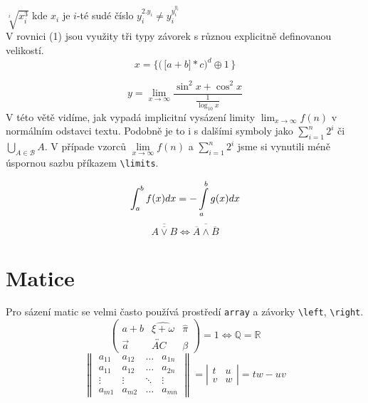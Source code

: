 \documentclass[a4paper, 11pt, twocolumn]{article}
\theoremstyle{definition}
\theoremstyle{definition}
\begin{document}
\quad $\sqrt[i]{x_i^3}$ kde $x_i$ je $i$-té sudé číslo \quad $y_i^{2.y_i}\neq y_i^{y_i^{y_i}}$\\


V rovnici (1) jsou využity tři typy závorek s různou explicitně definovanou velikostí.
\begin{equation}
x =\bigg\{\Big( \,\big[a + b\big] * c\Big)^d \oplus 1 \,\bigg\} \label{rovnice_1}
\end{equation}

$$
y = \lim_{x\to\infty} \frac{\sin^2 x + \cos^2x}{\frac{1}{\log_{10}{x}}}
$$
V této větě vidíme, jak vypadá implicitní vysázení limity $\lim_{x\to\infty} f(n)$ v normálním odstavci textu. Podobně je to i s dalšími symboly jako $\sum_{i=1}^{n} 2^{i}$ či $\bigcup_{A\in \mathcal{B}} A$. V případe vzorců $\lim\limits_{x\to\infty} f(n)$ a $\sum\limits_{i=1}^{n} 2^{i}$ jsme si vynutili méně úspornou sazbu příkazem \verb|\limits|.

\begin{equation}
\int_{a}^{b} f(x)dx = -\int\displaylimits_{a}^{b} g(x)dx
\label{rovnice_2}
\end{equation}
\begin{equation}
\overline{\overline{ A\lor B}} \Leftrightarrow \overline{\overline{A} \land \overline{B}}
\label{rovnice_3}
\end{equation}

\section{Matice}
Pro sázení matic se velmi často používá prostředí \verb|array| a závorky \verb|\left|, \verb|\right|.
$$
\left(
\begin{array}{ccc}
a + b & \widehat{\xi + \omega} & \hat{\pi}\\
\vec{a} & \overleftrightarrow{AC} & \beta
\end{array}
\right) = 1 \iff \mathbb{Q} = \mathbb{R}
$$
$$
\left\|
\begin{array}{cccc}
a_{11} & a_{12} & \dots  & a_{1n}\\
a_{11} & a_{12} & \dots  & a_{2n}\\
\vdots & \vdots & \ddots & \vdots\\
a_{m1} & a_{m2} & \dots  & a_{mn}
\end{array}
\right\| = 
\left|
\begin{array}{cc}
t & u\\
v & w
\end{array} 
\right| = tw-uv
$$
\end{document}
